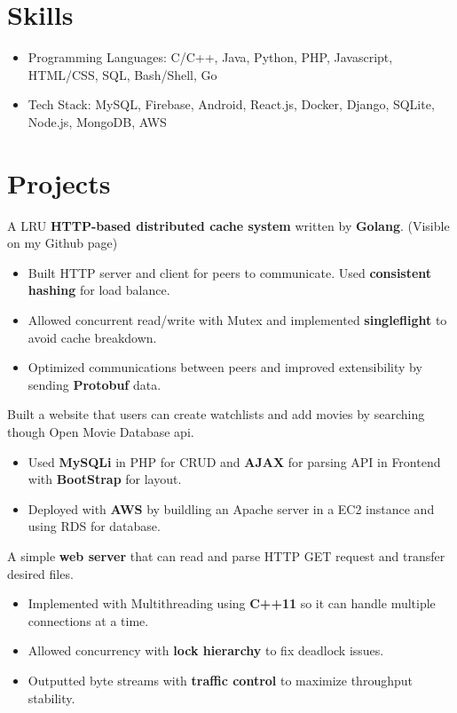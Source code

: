 \documentclass{resume}
\begin{document}
\section{Skills}
\begin{itemize}[parsep=0.5ex]
  \item Programming Languages: C/C++, Java, Python, PHP, Javascript, HTML/CSS, SQL, Bash/Shell, Go
  \item Tech Stack: MySQL, Firebase, Android, React.js, Docker, Django, SQLite, Node.js, MongoDB, AWS
\end{itemize}

\section{Projects}
 {}
  A LRU \textbf{HTTP-based distributed cache system} written by \textbf{Golang}. (Visible on my Github page)
\begin{itemize}
  \item Built HTTP server and client for peers to communicate. Used \textbf{consistent hashing} for load balance.
  \item Allowed concurrent read/write with Mutex and implemented \textbf{singleflight} to avoid cache breakdown.
  \item Optimized communications between peers and improved extensibility by sending \textbf{Protobuf} data.
\end{itemize}

 {}
  Built a website that users can create watchlists and add movies by searching though Open Movie Database api.
\begin{itemize}
  \item Used \textbf{MySQLi} in PHP for CRUD and \textbf{AJAX} for parsing API in Frontend with \textbf{BootStrap} for layout.
  \item Deployed with \textbf{AWS} by buildling an Apache server in a EC2 instance and using RDS for database.
\end{itemize}

 {}
  A simple \textbf{web server} that can read and parse HTTP GET request and transfer desired files.
\begin{itemize}
  \item Implemented with Multithreading using \textbf{C++11} so it can handle multiple connections at a time.
  \item Allowed concurrency with \textbf{lock hierarchy} to fix deadlock issues.
  \item Outputted byte streams with \textbf{traffic control} to maximize throughput stability.
\end{itemize}
\end{document}
